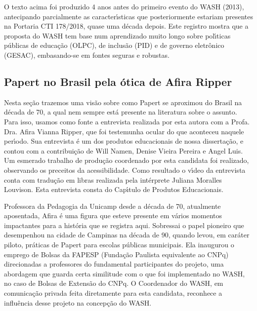 \documentclass[
12pt,		%
openright,	%
twoside,  %
a4paper,			%
chapter=TITLE,		%
english,			%
french,				%
spanish,			%
brazil				%
]{USPSC-classe/USPSC}
\begin{document}
O texto acima foi produzido 4 anos antes do primeiro evento do WASH (2013), antecipando parcialmente as caracter\'{\i}sticas que posteriormente estariam presentes na Portaria CTI 178/2018, quase uma d\'ecada depois. Este registro mostra que a proposta do WASH tem base num aprendizado muito longo sobre pol\'{\i}ticas p\'ublicas de educa\c{c}\~ao (OLPC), de inclus\~ao (PID) e de governo eletr\^onico (GESAC), embasando-se em fontes seguras e robustas.








\subsection[Papert no Brasil pela \'otica de Afira Ripper]{Papert no Brasil pela \'otica de Afira Ripper}\label{Papert no Brasil pela \'otica de Afira Ripper}
Nesta se\c{c}\~ao trazemos uma vis\~ao sobre como Papert se aproximou do Brasil na d\'ecada de 70, a qual nem sempre est\'a presente na literatura sobre o assunto. Para isso, usamos como fonte a entrevista realizada por esta autora com a Profa. Dra. Afira Vianna Ripper, que foi testemunha ocular do que aconteceu naquele per\'{\i}odo. Sua entrevista \'e um dos produtos educacionais de nossa disserta\c{c}\~ao, e contou com a contribui\c{c}\~ao de Will Namen, Denise Vieira Pereira e Angel Luis. Um esmerado trabalho de produ\c{c}\~ao coordenado por esta candidata foi realizado, observando os preceitos da acessibilidade. Como resultado o v\'{\i}deo da entrevista conta com tradu\c{c}\~ao em libras realizada pela int\'erprete Juliana Moralles Louvison. Esta entrevista consta do Cap\'{\i}tulo de Produtos Educacionais.








Professora da Pedagogia da Unicamp desde a d\'ecada de 70, atualmente aposentada, Afira \'e uma figura que esteve presente em v\'arios momentos impactantes para a hist\'oria que se registra aqui. Sobressai o papel pioneiro que  desempenhou na cidade de Campinas na d\'ecada de 90, quando levou, em car\'ater piloto, pr\'aticas de Papert para escolas p\'ublicas municipais. Ela inaugurou o emprego de Bolsas da FAPESP (Funda\c{c}\~ao Paulista equivalente ao CNPq) direcionadas a professores do fundamental participantes do projeto, uma abordagem que guarda certa similitude com o que foi implementado no WASH, no caso de Bolsas de Extens\~ao do CNPq. O Coordenador do WASH, em comunica\c{c}\~ao privada feita diretamente para esta candidata, reconhece a influ\^encia desse projeto na concep\c{c}\~ao do WASH.
\end{document}
